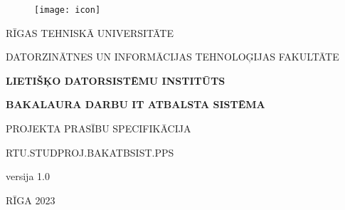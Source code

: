 \begin{titlepage}

    \begin{center}
        \begin{figure}[H]
            \centering
            \texttt{[image: icon]}
        \end{figure}

        \fontsize{12}{18}\selectfont
        RĪGAS TEHNISKĀ UNIVERSITĀTE

        DATORZINĀTNES UN INFORMĀCIJAS TEHNOLOĢIJAS FAKULTĀTE

        \textbf{LIETIŠĶO DATORSISTĒMU INSTITŪTS}

        \vspace*{6\baselineskip}

        \fontsize{18}{28}\selectfont
        \textbf{BAKALAURA DARBU IT ATBALSTA SISTĒMA}

        \fontsize{14}{14}\selectfont
        PROJEKTA PRASĪBU SPECIFIKĀCIJA

        RTU.STUDPROJ.BAKATBSIST.PPS

        versija 1.0

        \vspace*{\fill}

        RĪGA 2023
    \end{center}

\end{titlepage}

\clearpage